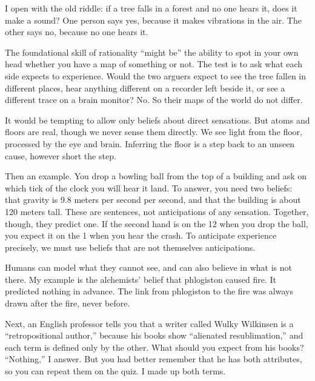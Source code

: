 
I open with the old riddle: if a tree falls in a forest and no one hears it, does it make a sound? One person says yes, because it makes vibrations in the air. The other says no, because no one hears it.

The foundational skill of rationality ``might be'' the ability to spot in your own head whether you have a map of something or not. The test is to ask what each side expects to experience. Would the two arguers expect to see the tree fallen in different places, hear anything different on a recorder left beside it, or see a different trace on a brain monitor? No. So their maps of the world do not differ. 

It would be tempting to allow only beliefs about direct sensations. But atoms and floors are real, though we never sense them directly. We see light from the floor, processed by the eye and brain. Inferring the floor is a step back to an unseen cause, however short the step.

Then an example. You drop a bowling ball from the top of a building and ask on which tick of the clock you will hear it land. To answer, you need two beliefs: that gravity is 9.8 meters per second per second, and that the building is about 120 meters tall. These are sentences, not anticipations of any sensation. Together, though, they predict one. If the second hand is on the 12 when you drop the ball, you expect it on the 1 when you hear the crash. To anticipate experience precisely, we must use beliefs that are not themselves anticipations.

Humans can model what they cannot see, and can also believe in what is not there. My example is the alchemists' belief that phlogiston caused fire. It predicted nothing in advance. The link from phlogiston to the fire was always drawn after the fire, never before. 

Next, an English professor tells you that a writer called Wulky Wilkinsen is a ``retropositional author,'' because his books show ``alienated resublimation,'' and each term is defined only by the other. What should you expect from his books? ``Nothing,'' I answer. But you had better remember that he has both attributes, so you can repeat them on the quiz. I made up both terms.

